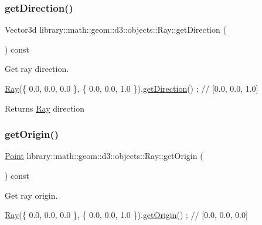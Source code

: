\subsubsection{\texorpdfstring{get\+Direction()}{getDirection()}}
{\footnotesize\ttfamily Vector3d library\+::math\+::geom\+::d3\+::objects\+::\+Ray\+::get\+Direction (\begin{DoxyParamCaption}{ }\end{DoxyParamCaption}) const}



Get ray direction. 


\begin{DoxyCode}
\hyperlink{classlibrary_1_1math_1_1geom_1_1d3_1_1objects_1_1_ray_a11b7613464daaebc6e25a758b057f203}{Ray}(\{ 0.0, 0.0, 0.0 \}, \{ 0.0, 0.0, 1.0 \}).\hyperlink{classlibrary_1_1math_1_1geom_1_1d3_1_1objects_1_1_ray_ab2e0a6cfd7c2c288ec615a479024fb7d}{getDirection}() ; \textcolor{comment}{// [0.0, 0.0, 1.0]}
\end{DoxyCode}


\begin{DoxyReturn}{Returns}
\hyperlink{classlibrary_1_1math_1_1geom_1_1d3_1_1objects_1_1_ray}{Ray} direction 
\end{DoxyReturn}
\mbox{\label{classlibrary_1_1math_1_1geom_1_1d3_1_1objects_1_1_ray_abaac9b7fcc10e2076ada11f2798386bd}} 
\subsubsection{\texorpdfstring{get\+Origin()}{getOrigin()}}
{\footnotesize\ttfamily \hyperlink{classlibrary_1_1math_1_1geom_1_1d3_1_1objects_1_1_point}{Point} library\+::math\+::geom\+::d3\+::objects\+::\+Ray\+::get\+Origin (\begin{DoxyParamCaption}{ }\end{DoxyParamCaption}) const}



Get ray origin. 


\begin{DoxyCode}
\hyperlink{classlibrary_1_1math_1_1geom_1_1d3_1_1objects_1_1_ray_a11b7613464daaebc6e25a758b057f203}{Ray}(\{ 0.0, 0.0, 0.0 \}, \{ 0.0, 0.0, 1.0 \}).\hyperlink{classlibrary_1_1math_1_1geom_1_1d3_1_1objects_1_1_ray_abaac9b7fcc10e2076ada11f2798386bd}{getOrigin}() ; \textcolor{comment}{// [0.0, 0.0, 0.0]}
\end{DoxyCode}


